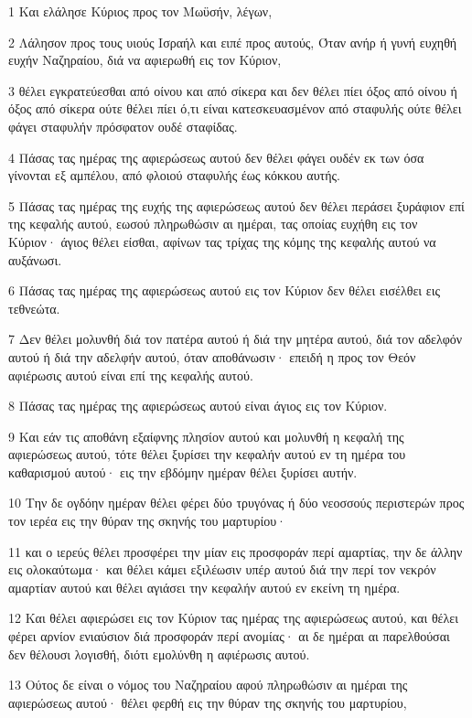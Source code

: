 \par 1 Και ελάλησε Κύριος προς τον Μωϋσήν, λέγων,
\par 2 Λάλησον προς τους υιούς Ισραήλ και ειπέ προς αυτούς, Όταν ανήρ ή γυνή ευχηθή ευχήν Ναζηραίου, διά να αφιερωθή εις τον Κύριον,
\par 3 θέλει εγκρατεύεσθαι από οίνου και από σίκερα και δεν θέλει πίει όξος από οίνου ή όξος από σίκερα ούτε θέλει πίει ό,τι είναι κατεσκευασμένον από σταφυλής ούτε θέλει φάγει σταφυλήν πρόσφατον ουδέ σταφίδας.
\par 4 Πάσας τας ημέρας της αφιερώσεως αυτού δεν θέλει φάγει ουδέν εκ των όσα γίνονται εξ αμπέλου, από φλοιού σταφυλής έως κόκκου αυτής.
\par 5 Πάσας τας ημέρας της ευχής της αφιερώσεως αυτού δεν θέλει περάσει ξυράφιον επί της κεφαλής αυτού, εωσού πληρωθώσιν αι ημέραι, τας οποίας ευχήθη εις τον Κύριον· άγιος θέλει είσθαι, αφίνων τας τρίχας της κόμης της κεφαλής αυτού να αυξάνωσι.
\par 6 Πάσας τας ημέρας της αφιερώσεως αυτού εις τον Κύριον δεν θέλει εισέλθει εις τεθνεώτα.
\par 7 Δεν θέλει μολυνθή διά τον πατέρα αυτού ή διά την μητέρα αυτού, διά τον αδελφόν αυτού ή διά την αδελφήν αυτού, όταν αποθάνωσιν· επειδή η προς τον Θεόν αφιέρωσις αυτού είναι επί της κεφαλής αυτού.
\par 8 Πάσας τας ημέρας της αφιερώσεως αυτού είναι άγιος εις τον Κύριον.
\par 9 Και εάν τις αποθάνη εξαίφνης πλησίον αυτού και μολυνθή η κεφαλή της αφιερώσεως αυτού, τότε θέλει ξυρίσει την κεφαλήν αυτού εν τη ημέρα του καθαρισμού αυτού· εις την εβδόμην ημέραν θέλει ξυρίσει αυτήν.
\par 10 Την δε ογδόην ημέραν θέλει φέρει δύο τρυγόνας ή δύο νεοσσούς περιστερών προς τον ιερέα εις την θύραν της σκηνής του μαρτυρίου·
\par 11 και ο ιερεύς θέλει προσφέρει την μίαν εις προσφοράν περί αμαρτίας, την δε άλλην εις ολοκαύτωμα· και θέλει κάμει εξιλέωσιν υπέρ αυτού διά την περί τον νεκρόν αμαρτίαν αυτού και θέλει αγιάσει την κεφαλήν αυτού εν εκείνη τη ημέρα.
\par 12 Και θέλει αφιερώσει εις τον Κύριον τας ημέρας της αφιερώσεως αυτού, και θέλει φέρει αρνίον ενιαύσιον διά προσφοράν περί ανομίας· αι δε ημέραι αι παρελθούσαι δεν θέλουσι λογισθή, διότι εμολύνθη η αφιέρωσις αυτού.
\par 13 Ούτος δε είναι ο νόμος του Ναζηραίου αφού πληρωθώσιν αι ημέραι της αφιερώσεως αυτού· θέλει φερθή εις την θύραν της σκηνής του μαρτυρίου,

